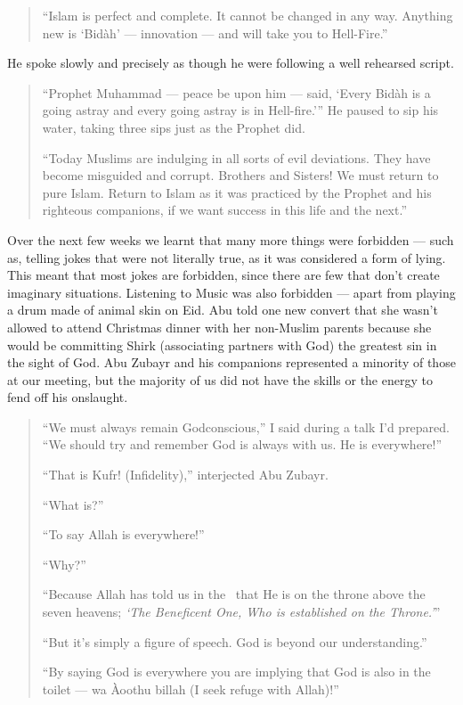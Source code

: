 \documentclass[12pt]{memoir}
\begin{document}
\begin{quote}
“Islam is perfect and complete.
It cannot be changed in any way.
Anything new is ‘Bid\`ah’ — innovation — and will take you to Hell-Fire.”
\end{quote}

He spoke slowly and precisely
as though he were following a well rehearsed script.

\begin{quote}
“Prophet Muhammad — peace be upon him — said,
‘Every Bid\`ah is a going astray and every going astray is in Hell-fire.’”
He paused to sip his water, taking three sips just as the Prophet did.

“Today Muslims are indulging in all sorts of evil deviations.
They have become misguided and corrupt.
Brothers and Sisters!
We must return to pure Islam.
Return to Islam as it was practiced by the Prophet
and his righteous companions,
if we want success in this life and the next.”
\end{quote}

Over the next few weeks we learnt that many more things were forbidden —
such as, telling jokes that were not literally true,
as it was considered a form of lying.
This meant that most jokes are forbidden,
since there are few that don’t create imaginary situations.
Listening to Music was also forbidden —
apart from playing a drum made of animal skin on Eid.
Abu  told one new convert that she wasn’t allowed
to attend Christmas dinner with her non-Muslim parents
because she would be committing Shirk (associating partners with God)
the greatest sin in the sight of God.
Abu Zubayr and his companions represented a minority of those at our meeting,
but the majority of us did not have the skills
or the energy to fend off his onslaught.

\begin{quote}
“We must always remain God\–conscious,”
I said during a talk I’d prepared.
“We should try and remember God is always with us. He is everywhere!”

“That is Kufr! (Infidelity),” interjected Abu Zubayr.

“What is?”

“To say Allah is everywhere!”

“Why?”

“Because Allah has told us in the \Quran\
that He is on the throne above the seven heavens;
\emph{‘The Beneficent One, Who is established on the Throne.’}”

“But it’s simply a figure of speech.
God is beyond our understanding.”

“By saying God is everywhere you are implying that God is also in the toilet —
wa \`Aoothu billah (I seek refuge with Allah)!”
\end{quote}
\end{document}
